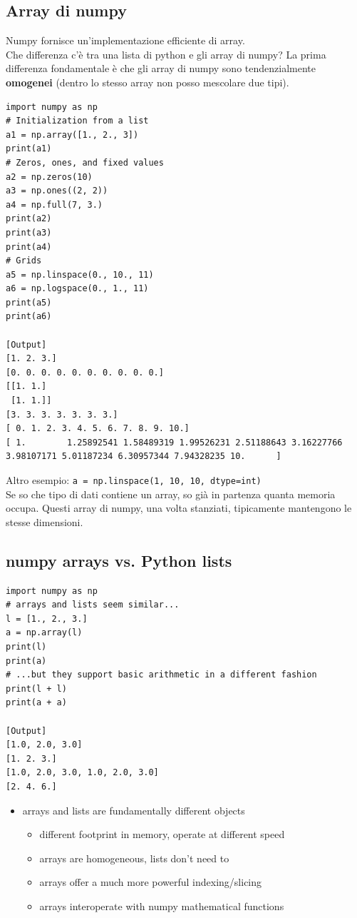 \subsection{Array di numpy}
Numpy fornisce un'implementazione efficiente di array.\\

Che differenza c'è tra una lista di python e gli array di numpy?
La prima differenza fondamentale è che gli array di numpy sono tendenzialmente \textbf{omogenei} (dentro lo stesso array non posso mescolare due tipi).\\

 

\begin{verbatim}
import numpy as np
# Initialization from a list
a1 = np.array([1., 2., 3])
print(a1)
# Zeros, ones, and fixed values
a2 = np.zeros(10)
a3 = np.ones((2, 2))
a4 = np.full(7, 3.)
print(a2)
print(a3)
print(a4)
# Grids
a5 = np.linspace(0., 10., 11)
a6 = np.logspace(0., 1., 11)
print(a5)
print(a6)

[Output]
[1. 2. 3.]
[0. 0. 0. 0. 0. 0. 0. 0. 0. 0.]
[[1. 1.]
 [1. 1.]]
[3. 3. 3. 3. 3. 3. 3.]
[ 0. 1. 2. 3. 4. 5. 6. 7. 8. 9. 10.]
[ 1.        1.25892541 1.58489319 1.99526231 2.51188643 3.16227766
3.98107171 5.01187234 6.30957344 7.94328235 10.      ]
\end{verbatim}

Altro esempio: \texttt{a = np.linspace(1, 10, 10, dtype=int)}\\
\noindent   
Se so che tipo di dati contiene un array, so già in partenza quanta memoria occupa. Questi array di numpy, una volta stanziati, tipicamente mantengono le stesse dimensioni.
\subsection{numpy arrays vs. Python lists}

\begin{verbatim}
import numpy as np
# arrays and lists seem similar...
l = [1., 2., 3.]
a = np.array(l)
print(l)
print(a)
# ...but they support basic arithmetic in a different fashion
print(l + l)
print(a + a)

[Output]
[1.0, 2.0, 3.0]
[1. 2. 3.]
[1.0, 2.0, 3.0, 1.0, 2.0, 3.0]
[2. 4. 6.]
\end{verbatim}

 \begin{itemize}
  \item arrays and lists are fundamentally different objects
    \begin{itemize}
    \item different footprint in memory, operate at different speed
    \item arrays are homogeneous, lists don't need to
    \item arrays offer a much more powerful indexing/slicing
    \item arrays interoperate with numpy mathematical functions
    \end{itemize}
  \end{itemize}
  
